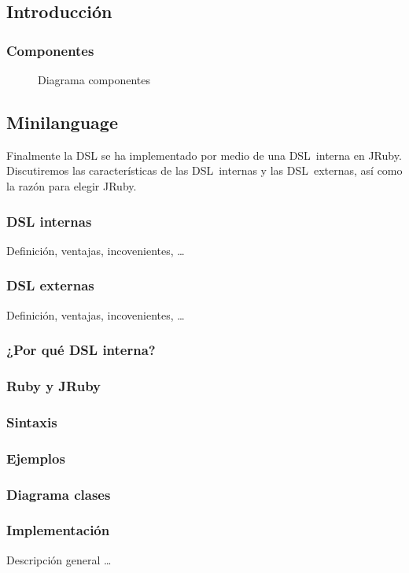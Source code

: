 \subsection{Introducción}
\subsubsection{Componentes}
\begin{figure}[!hbp]
\makebox[\textwidth]{\framebox[5cm]{\rule{0pt}{5cm}}}
\caption{Diagrama componentes}
\end{figure}
\subsection{Minilanguage}
Finalmente la DSL se ha implementado por medio de una DSL~interna en
JRuby. Discutiremos las características de las DSL~internas y las
DSL~externas, así como la razón para elegir JRuby.
\subsubsection{DSL internas}
Definición, ventajas, incovenientes, \ldots{}
\subsubsection{DSL externas}
Definición, ventajas, incovenientes, \ldots{}
\subsubsection{¿Por qué DSL interna?}
\subsubsection{Ruby y JRuby}
\subsubsection{Sintaxis}
\subsubsection{Ejemplos}
\subsubsection{Diagrama clases}
\subsubsection{Implementación}
Descripción general \ldots{}
